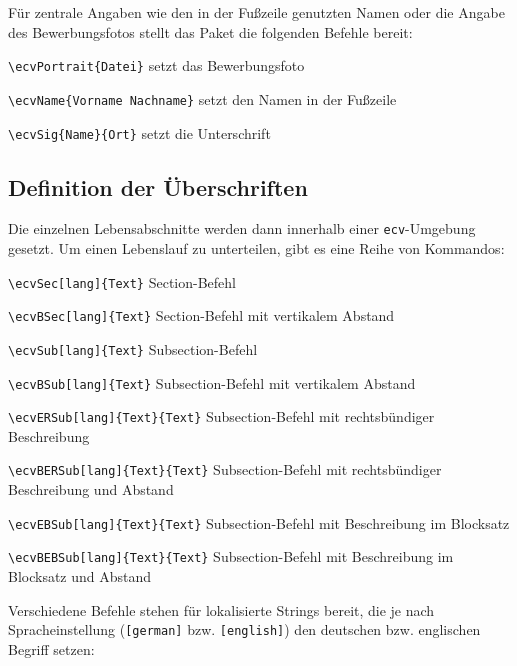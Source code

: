 \documentclass[ngerman]{dtk}
\begin{document}
Für zentrale Angaben wie den in der Fußzeile genutzten Namen oder die Angabe des Bewerbungsfotos stellt das Paket die folgenden Befehle bereit:

\begin{compactitem}
\item \verb|\ecvPortrait{Datei}| setzt das Bewerbungsfoto
\item \verb|\ecvName{Vorname Nachname}| setzt den Namen in der Fußzeile
\item \verb|\ecvSig{Name}{Ort}| setzt die Unterschrift
\end{compactitem}

\subsection{Definition der Überschriften}

Die einzelnen Lebensabschnitte werden dann innerhalb einer \texttt{ecv}-Umgebung gesetzt. Um einen Lebenslauf zu unterteilen, gibt es eine Reihe von Kommandos:

\begin{compactitem}
\item \verb|\ecvSec[lang]{Text}| Section-Befehl 
\item \verb|\ecvBSec[lang]{Text}| Section-Befehl mit vertikalem Abstand
\item \verb|\ecvSub[lang]{Text}| Subsection-Befehl 
\item \verb|\ecvBSub[lang]{Text}| Subsection-Befehl mit vertikalem Abstand
\item \verb|\ecvERSub[lang]{Text}{Text}| Subsection-Befehl mit rechtsbündiger Beschreibung
\item \verb|\ecvBERSub[lang]{Text}{Text}| Subsection-Befehl mit rechtsbündiger Beschreibung und Abstand 
\item \verb|\ecvEBSub[lang]{Text}{Text}| Subsection-Befehl mit Beschreibung im Blocksatz
\item \verb|\ecvBEBSub[lang]{Text}{Text}| Subsection-Befehl mit Beschreibung im Blocksatz und Abstand 
\end{compactitem}

Verschiedene Befehle stehen für lokalisierte Strings bereit, die je nach Spracheinstellung (\texttt{[german]} bzw. \texttt{[english]}) den deutschen bzw. englischen Begriff  setzen:
\end{document}
